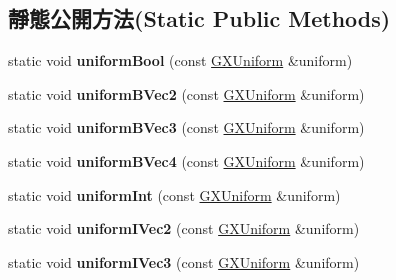 \subsection*{靜態公開方法(Static Public Methods)}
\begin{DoxyCompactItemize}
\item 
static void {\bfseries uniform\+Bool} (const \hyperlink{class_i_dream_sky_1_1_g_x_uniform}{G\+X\+Uniform} \&uniform)\hypertarget{class_i_dream_sky_1_1_g_x_context_a2c1cf23ab6f34b61c49dbbfa105e0bc9}{}\label{class_i_dream_sky_1_1_g_x_context_a2c1cf23ab6f34b61c49dbbfa105e0bc9}

\item 
static void {\bfseries uniform\+B\+Vec2} (const \hyperlink{class_i_dream_sky_1_1_g_x_uniform}{G\+X\+Uniform} \&uniform)\hypertarget{class_i_dream_sky_1_1_g_x_context_a934a8ab1927134815cfeca35df5daaa9}{}\label{class_i_dream_sky_1_1_g_x_context_a934a8ab1927134815cfeca35df5daaa9}

\item 
static void {\bfseries uniform\+B\+Vec3} (const \hyperlink{class_i_dream_sky_1_1_g_x_uniform}{G\+X\+Uniform} \&uniform)\hypertarget{class_i_dream_sky_1_1_g_x_context_add1ae1d6b2fbde9d813fd2bd9b387780}{}\label{class_i_dream_sky_1_1_g_x_context_add1ae1d6b2fbde9d813fd2bd9b387780}

\item 
static void {\bfseries uniform\+B\+Vec4} (const \hyperlink{class_i_dream_sky_1_1_g_x_uniform}{G\+X\+Uniform} \&uniform)\hypertarget{class_i_dream_sky_1_1_g_x_context_a7f8ede0252d39690f609649b702eae82}{}\label{class_i_dream_sky_1_1_g_x_context_a7f8ede0252d39690f609649b702eae82}

\item 
static void {\bfseries uniform\+Int} (const \hyperlink{class_i_dream_sky_1_1_g_x_uniform}{G\+X\+Uniform} \&uniform)\hypertarget{class_i_dream_sky_1_1_g_x_context_a4bcffc55b55a66a1bc12259d2b60eea6}{}\label{class_i_dream_sky_1_1_g_x_context_a4bcffc55b55a66a1bc12259d2b60eea6}

\item 
static void {\bfseries uniform\+I\+Vec2} (const \hyperlink{class_i_dream_sky_1_1_g_x_uniform}{G\+X\+Uniform} \&uniform)\hypertarget{class_i_dream_sky_1_1_g_x_context_ad5122eb5e4da8f12151a1426b1995218}{}\label{class_i_dream_sky_1_1_g_x_context_ad5122eb5e4da8f12151a1426b1995218}

\item 
static void {\bfseries uniform\+I\+Vec3} (const \hyperlink{class_i_dream_sky_1_1_g_x_uniform}{G\+X\+Uniform} \&uniform)\hypertarget{class_i_dream_sky_1_1_g_x_context_a24af25700a4d2eef5f678067e4218d80}{}\label{class_i_dream_sky_1_1_g_x_context_a24af25700a4d2eef5f678067e4218d80}


\end{DoxyCompactItemize}
